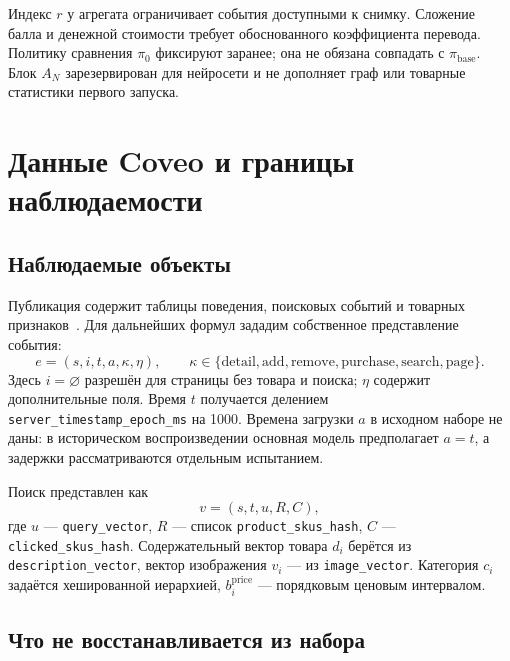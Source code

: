 \documentclass[12pt,a4paper]{article}
\newcommand{\code}[1]{{\ttfamily\small\nolinkurl{#1}}}
\theoremstyle{plainru}
\begin{document}
Индекс \(r\) у агрегата ограничивает события доступными к снимку.
Сложение балла и денежной стоимости требует обоснованного коэффициента
перевода. Политику сравнения \(\pi_0\) фиксируют заранее;
она не обязана совпадать с \(\pi_{\mathrm{base}}\).
Блок \(A_N\) зарезервирован для нейросети и не дополняет граф
или товарные статистики первого запуска.

\section{Данные Coveo и границы наблюдаемости}\label{sec:data}

\subsection{Наблюдаемые объекты}

Публикация содержит таблицы поведения, поисковых событий и товарных
признаков~\cite{coveo-data,coveo-paper}. Для дальнейших формул зададим
собственное представление события:
\begin{equation}\label{eq:data-event}
e=(s,i,t,a,\kappa,\eta),\qquad
\kappa\in\{\mathrm{detail},\mathrm{add},\mathrm{remove},
\mathrm{purchase},\mathrm{search},\mathrm{page}\}.
\end{equation}
Здесь \(i=\varnothing\) разрешён для страницы без товара и поиска;
\(\eta\) содержит дополнительные поля. Время \(t\) получается делением
\code{server_timestamp_epoch_ms} на 1000. Времена загрузки \(a\)
в исходном наборе не даны: в историческом воспроизведении основная модель
предполагает \(a=t\), а задержки рассматриваются отдельным испытанием.

Поиск представлен как
\begin{equation}\label{eq:data-search}
v=(s,t,u,R,C),
\end{equation}
где \(u\) --- \code{query_vector}, \(R\) --- список
\code{product_skus_hash}, \(C\) --- \code{clicked_skus_hash}.
Содержательный вектор товара \(d_i\) берётся из
\code{description_vector}, вектор изображения \(v_i\) --- из
\code{image_vector}. Категория \(c_i\) задаётся хешированной иерархией,
\(b_i^{\mathrm{price}}\) --- порядковым ценовым интервалом.

\subsection{Что не восстанавливается из набора}
\end{document}
